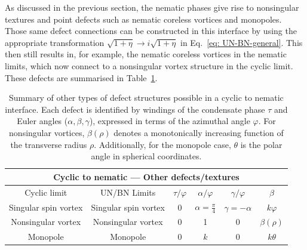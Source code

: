 As discussed in the previous section, the nematic phases give rise to
nonsingular textures and point defects such as nematic coreless vortices and
monopoles.
Those same defect connections can be constructed in this interface by using
the appropriate transformation \(\sqrt{1+\eta} \rightarrow i\sqrt{1+\eta}\) in
Eq.~\eqref{eq: UN-BN-general}.
This then still results in, for example, the nematic coreless vortices in the
nematic limits, which now connect to a nonsingular vortex structure in the
cyclic limit.
These defects are summarised in Table~\ref{tab: C-N-other}.
\begin{table}
    \centering
    \begin{tabular}{cccccc}
        \toprule
        \multicolumn{6}{c}{Cyclic to nematic --- Other defects/textures} \\
        \midrule
        Cyclic limit & UN/BN Limits &  \(\tau/\varphi \) & \(\alpha/\varphi \)
        & \(\gamma/\varphi \) & \(\beta \) \\
        \midrule
         Singular spin vortex & Singular spin vortex & 0 &
         \(\alpha=\frac{\pi}{4}\) & \(\gamma=-\alpha \) & \(k\varphi \) \\
         Nonsingular vortex & Nonsingular vortex & 0 & 1 & 0
         & \(\beta(\rho)\) \\ 
         Monopole & Monopole & 0 & \(k\)  & 0 & \(k\theta \) \\
        \bottomrule
    \end{tabular}
    \caption{\label{tab: C-N-other}Summary of other types of defect structures
    possible in a cyclic to nematic interface.
    Each defect is identified by windings of the condensate phase \(\tau \) and
    Euler angles (\(\alpha, \beta, \gamma \)), expressed in terms of the
    azimuthal angle \(\varphi \).
    For nonsingular vortices, \(\beta(\rho)\) denotes a monotonically increasing
    function of the transverse radius \(\rho \).
    Additionally, for the monopole case, \(\theta \) is the polar angle in
    spherical coordinates.}
\end{table}

